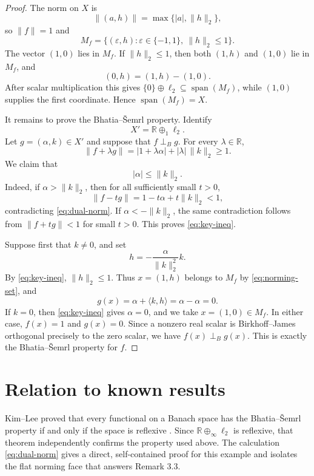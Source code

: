 \documentclass[11pt]{amsart}
\newcommand{\R}{\mathbb R}
\newcommand{\BS}{Bhatia--\v{S}emrl}
\begin{document}
\begin{proof}
The norm on $X$ is
\[
  \|(a,h)\|=\max\{|a|,\|h\|_2\},
\]
so $\|f\|=1$ and
\begin{equation}\label{eq:norming-set}
  M_f=\{(\varepsilon,h):\varepsilon\in\{-1,1\},\ \|h\|_2\leq1\}.
\end{equation}
The vector $(1,0)$ lies in $M_f$.  If $\|h\|_2\leq1$, then both $(1,h)$
and $(1,0)$ lie in $M_f$, and
\[
  (0,h)=(1,h)-(1,0).
\]
After scalar multiplication this gives $\{0\}\oplus\ell_2\subseteq
\operatorname{span}(M_f)$, while $(1,0)$ supplies the first coordinate.
Hence $\operatorname{span}(M_f)=X$.

It remains to prove the \BS{} property.  Identify
\[
  X'=\R\oplus_1\ell_2.
\]
Let $g=(\alpha,k)\in X'$ and suppose that $f\perp_B g$.  For every
$\lambda\in\R$,
\begin{equation}\label{eq:dual-norm}
 \|f+\lambda g\|
 =|1+\lambda\alpha|+|\lambda|\,\|k\|_2
 \geq1.
\end{equation}
We claim that
\begin{equation}\label{eq:key-ineq}
  |\alpha|\leq\|k\|_2.
\end{equation}
Indeed, if $\alpha>\|k\|_2$, then for all sufficiently small $t>0$,
\[
 \|f-tg\|=1-t\alpha+t\|k\|_2<1,
\]
contradicting \eqref{eq:dual-norm}.  If
$\alpha<-\|k\|_2$, the same contradiction follows from
$\|f+tg\|<1$ for small $t>0$.  This proves \eqref{eq:key-ineq}.

Suppose first that $k\neq0$, and set
\[
  h=-\frac{\alpha}{\|k\|_2^2}k.
\]
By \eqref{eq:key-ineq}, $\|h\|_2\leq1$.  Thus $x=(1,h)$ belongs to
$M_f$ by \eqref{eq:norming-set}, and
\[
  g(x)=\alpha+\langle k,h\rangle
  =\alpha-\alpha=0.
\]
If $k=0$, then \eqref{eq:key-ineq} gives $\alpha=0$, and we take
$x=(1,0)\in M_f$.  In either case, $f(x)=1$ and $g(x)=0$.  Since a nonzero
real scalar is Birkhoff--James orthogonal precisely to the zero scalar, we
have $f(x)\perp_B g(x)$.  This is exactly the \BS{} property for $f$.
\end{proof}

\section*{Relation to known results}

Kim--Lee proved that every functional on a Banach space has the \BS{} property
if and only if the space is reflexive \cite{KL}.  Since
$\R\oplus_\infty\ell_2$ is reflexive, that theorem independently confirms
the property used above.  The calculation \eqref{eq:dual-norm} gives a direct,
self-contained proof for this example and isolates the flat norming face that
answers Remark 3.3.
\end{document}
